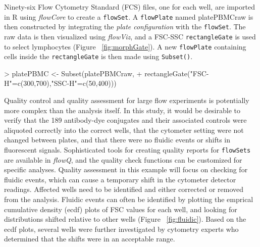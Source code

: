 \documentclass[12pt]{article}
\newcommand{\Rfunction}[1]{{\texttt{#1()}}}
\newcommand{\Robject}[1]{{\texttt{#1}}}
\newcommand{\Rpackage}[1]{{\textit{#1}}}
\begin{document}
Ninety-six Flow Cytometry Standard (FCS) files, one for each well, are imported in R using \Rpackage{flowCore} to create a \Robject{flowSet}.
A \Robject{flowPlate} named platePBMCraw is then constructed by integrating the \textit{plate configuration} with the \Robject{flowSet}. 
The raw data is then visualized using \Rpackage{flowViz}, and a FSC-SSC \Robject{rectangleGate} is used to select lymphocytes (Figure ~\ref{fig:morphGate}).
A new \Robject{flowPlate} containing cells inside the \Robject{rectangleGate} is then made using \Rfunction{Subset}.
\begin{Schunk}
\begin{Sinput}
> platePBMC <- Subset(platePBMCraw,
+ 		rectangleGate("FSC-H"=c(300,700),"SSC-H"=c(50,400)))	
\end{Sinput}
\end{Schunk}

Quality control and quality assessment for large flow experiments is potentially more complex than the analysis itself. In this study, 
it would be desirable to verify that the 189 antibody-dye conjugates and their associated controls were aliquoted correctly into the correct wells, 
that the cytometer setting were not changed between plates, and that there were no fluidic events or shifts in fluorescent signals. Sophisticated tools for creating
quality reports for \Robject{flowSets} are available in \Rpackage{flowQ}, and the quality check functions can be customized for specific analyses.
Quality assessment in this example will focus on checking for fluidic events, which 
can cause a temporary shift in the cytometer detector readings.  Affected wells need
to be identified and either corrected or removed from the analysis. 
Fluidic events can often be identified by plotting the emprical cumulative density (ecdf) plots of FSC
values for each well, and looking for distributions shifted relative to other wells (Figure ~\ref{fig:fluidic}). Based on the ecdf
plots, several wells were further investigated by cytometry experts who determined that the shifts were in an acceptable range.
\end{document}
